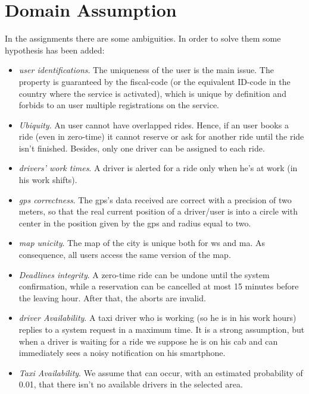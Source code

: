\section{Domain Assumption}
In the assignments there are some ambiguities. In order to solve them some hypothesis has been added:
\begin{itemize}
	\item \textit{\Gls{user} identifications}. The uniqueness of the \gls{user} is the main issue. The property is guaranteed by the fiscal-code (or the equivalent ID-code in the country where the service is activated), which is unique by definition and forbids to an \gls{user} multiple registrations on the service.
	\item \textit{Ubiquity}. An \gls{user} cannot have overlapped \glspl{ride}. Hence, if an \gls{user} books a \gls{ride} (even in zero-time) it cannot reserve or ask for another \gls{ride} until the \gls{ride} isn't finished.
Besides, only one \gls{driver} can be assigned to each \gls{ride}.
	\item \textit{\Glspl{driver}' work times}. A \gls{driver} is alerted for a \gls{ride} only when he's at work (in his work shifts).
	\item \textit{\gls{gps} correctness}. The \gls{gps}'s data received are correct with a precision of two meters, so that the real current position of a \gls{driver}/\gls{user} is into a circle with center in the position given by the \gls{gps} and radius equal to two.
	\item \textit{\Gls{map} unicity}. The \gls{map} of the city is unique both for \gls{ws} and \gls{ma}. As consequence, all \glspl{user} access the same version of the \gls{map}.
	\item \textit{Deadlines integrity}. A zero-time \gls{ride} can be undone until the system confirmation, while a \gls{reservation} can be cancelled at most 15 minutes before the leaving hour. After that, the aborts are invalid.
	\item \textit{\Gls{driver} Availability}. A taxi \gls{driver} who is working (so he is in his work hours) replies to a system request in a maximum time. It is a strong assumption, but when a \gls{driver} is waiting for a \gls{ride} we suppose he is on his cab and can immediately sees a noisy notification on his smartphone.
	\item \textit{Taxi Availability}. We assume that can occur, with an estimated probability of 0.01, that there isn't no available \glspl{driver} in the selected area. 
\end{itemize}

